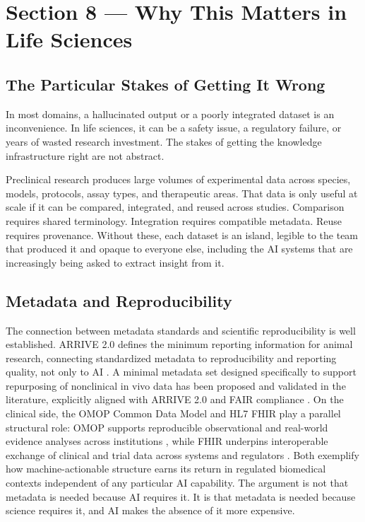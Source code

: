 \documentclass[man,12pt,donotrepeattitle]{apa7}
\begin{document}
\section{Section 8 --- Why This Matters in Life Sciences}

\subsection{The Particular Stakes of Getting It Wrong}

In most domains, a hallucinated output or a poorly integrated dataset is an
inconvenience. In life sciences, it can be a safety issue, a regulatory
failure, or years of wasted research investment. The stakes of getting the
knowledge infrastructure right are not abstract.

Preclinical research produces large volumes of experimental data across
species, models, protocols, assay types, and therapeutic areas. That data
is only useful at scale if it can be compared, integrated, and reused across
studies. Comparison requires shared terminology. Integration requires
compatible metadata. Reuse requires provenance. Without these, each dataset
is an island, legible to the team that produced it and opaque to everyone
else, including the AI systems that are increasingly being asked to extract
insight from it.

\subsection{Metadata and Reproducibility}

The connection between metadata standards and scientific reproducibility is
well established. ARRIVE 2.0 defines the minimum reporting information for
animal research, connecting standardized metadata to reproducibility and
reporting quality, not only to AI \parencite{dusert2020}. A minimal
metadata set designed specifically to support repurposing of nonclinical in
vivo data has been proposed and validated in the literature, explicitly
aligned with ARRIVE 2.0 and FAIR compliance \parencite{moresis2024}. On the
clinical side, the OMOP Common Data Model and HL7 FHIR play a parallel
structural role: OMOP supports reproducible observational and real-world
evidence analyses across institutions \parencite{hripcsak2015}, while FHIR
underpins interoperable exchange of clinical and trial data across systems
and regulators \parencite{bender2013}. Both exemplify how machine-actionable
structure earns its return in regulated biomedical contexts independent of
any particular AI capability. The argument is not that metadata is needed
because AI requires it. It is that metadata is needed because science
requires it, and AI makes the absence of it more expensive.
\end{document}
